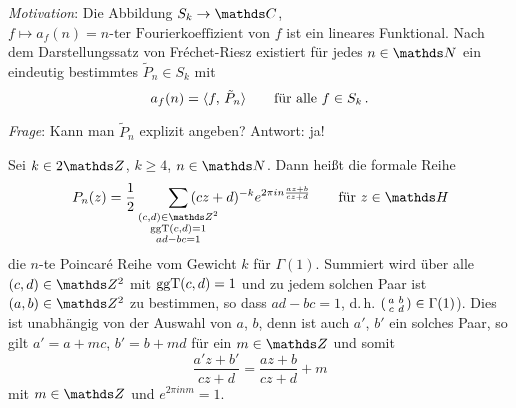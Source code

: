 \emph{Motivation}: Die Abbildung $S_k \ra \CC$, $f \mapsto a_f(n) = \text{$n$-ter Fourierkoeffizient von $f$}$ ist ein lineares Funktional.
Nach dem Darstellungssatz von Fréchet-Riesz existiert für jedes $n \in \NN$ ein eindeutig bestimmtes $\tilde P_n \in S_k$ mit
\[
	a_f(n) = \scalarprd f{\tilde P_n} \qquad \text{für alle } f\in S_k\,.
\]

\emph{Frage}: Kann man $\tilde P_n$ explizit angeben? Antwort: ja!

\begin{defi}
	Sei $k \in 2\ZZ$, $k \geq 4$, $n\in\NN$. Dann heißt die formale Reihe
	\[
		P_n(z)
		= \frac{1}{2} \smashoperator[r]{\sum_{\substack{(c,d)\in\ZZ^2 \\ \ggt(c,d) = 1 \\ ad-bc = 1}}} \, (cz+d)^{-k} e^{2\pi in \frac{az+b}{cz+d}}
		\qquad \text{für } z \in \HH
	\]
	die $n$-te Poincaré Reihe vom Gewicht $k$ für $\Gamma(1)$.
	Summiert wird über alle $(c,d) \in \ZZ^2$ mit $\operatorname{ggT}(c,d) = 1$ und zu jedem solchen Paar ist $(a,b) \in \ZZ^2$ zu bestimmen, so dass $ad-bc = 1$, d.\,h. $\abcd \in \Gamma(1)$).
	Dies ist unabhängig von der Auswahl von $a$, $b$, denn ist auch $a'$, $b'$ ein solches Paar, so gilt $a' = a+mc$, $b' = b + md$ für ein $m \in \ZZ$ und somit
	\[
		\frac{a'z+b'}{cz+d} = \frac{az+b}{cz + d} + m
	\]
	mit $m \in \ZZ$ und $e^{2\pi inm} = 1$.
\end{defi}